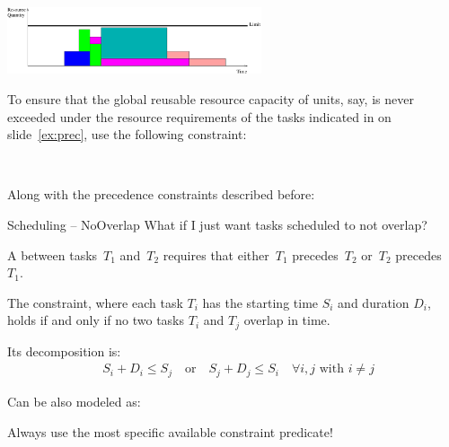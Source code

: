\documentclass{cons-beamer}
\begin{document}
\begin{flashcardcpmpy}
\begin{frame}[fragile]  %
  \begin{center}
    \includegraphics[width=75mm]{images/scheduling1}
  \end{center}
  
  \begin{example}
    To ensure that the global reusable resource capacity of
     units, say, is never exceeded under the resource
    requirements of the tasks indicated in  on
    slide~\ref{ex:prec}, use the following constraint:
    
    \vfill
    \vfill

    $ $
    
    Along with the precedence constraints described before:

    
  \end{example}
\end{frame}
\end{flashcardcpmpy}

\begin{frame}{Scheduling -- NoOverlap}
  What if I just want tasks scheduled to not overlap?
    
  A  between tasks~$T_1$ and~$T_2$
  requires that \alert{either}~$T_1$ precedes~$T_2$
  \alert{or}~$T_2$ precedes~$T_1$.
  
  \begin{definition}[Carlier, 1982]
    The  constraint, where each task
    $T_i$ has the starting time $S_i$ and
    duration $D_i$, holds if and only if no two tasks $T_i$ and $T_j$ overlap in time.
  \end{definition}

  Its decomposition is:
  \begin{align*}
    & S_i + D_i \leq S_j \quad \text{or} \quad S_j + D_j \leq S_i \quad \forall i, j \text{ with } i \neq j
  \end{align*}
  \vfill

  Can be also modeled as: 

  \alert{Always use the most specific available constraint predicate!}
\end{frame}
\end{document}
